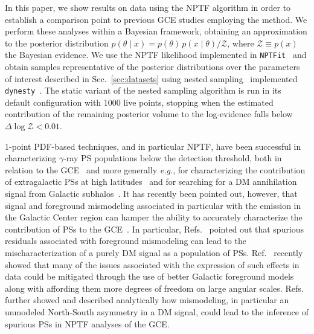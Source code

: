 \documentclass[prd,aps,10pt,nofootinbib,twocolumn,superscriptaddress,preprintnumbers,balancelastpage,longbibliography]{revtex4-1}
\begin{document}
In this paper, we show results on \Fermi data using the NPTF algorithm in order to establish a comparison point to previous GCE studies employing the method. We perform these analyses within a Bayesian framework, obtaining an approximation to the posterior distribution $p(\theta\mid x) = p(\theta)\, p(x\mid\theta) / \mathcal Z$, where $\mathcal Z \equiv p(x)$ the Bayesian evidence. 
We use the NPTF likelihood implemented in \texttt{NPTFit}~\cite{Mishra-Sharma:2016gis} and obtain samples representative of the posterior distributions over the parameters of interest described in Sec.~\ref{sec:datasets} using nested sampling~\cite{Feroz:2013hea,skilling2006} implemented \texttt{dynesty}~\cite{Speagle_2020}. The static variant of the nested sampling algorithm is run in its default configuration with 1000 live points, stopping when the estimated contribution of the remaining posterior volume to the log-evidence falls below $\Delta \log \mathcal Z < 0.01$.

1-point PDF-based techniques, and in particular NPTF, have been successful in characterizing $\gamma$-ray PS populations below the \Fermi detection threshold, both in relation to the GCE~\cite{Lee:2015fea,Leane:2020pfc,Leane:2020nmi,Buschmann:2020adf} and more generally \emph{e.g.}, for characterizing the contribution of extragalactic PSs at high latitudes~\cite{Lisanti:2016jub} and for searching for a DM annihilation signal from Galactic subhalos~\cite{Somalwar:2020awt}. It has recently been pointed out, however, that signal and foreground mismodeling associated in particular with the emission in the Galactic Center region can hamper the ability to accurately characterize the contribution of PSs to the GCE~\cite{Leane:2019xiy,Leane:2020pfc}. In particular, Refs.~\cite{Lee:2015fea,Leane:2019xiy,Chang:2019ars} pointed out that spurious residuals associated with foreground mismodeling can lead to the mischaracterization of a purely DM signal as a population of PSs. Ref.~\cite{Buschmann:2020adf} recently showed that many of the issues associated with the expression of such effects in \Fermi data could be mitigated through the use of better Galactic foreground models along with affording them more degrees of freedom on large angular scales.
Refs.~\cite{Leane:2020pfc,Leane:2020nmi} further showed and described analytically how mismodeling, in particular an unmodeled North-South asymmetry in a DM signal, could lead to the inference of spurious PSs in NPTF analyses of the GCE. %
\end{document}
